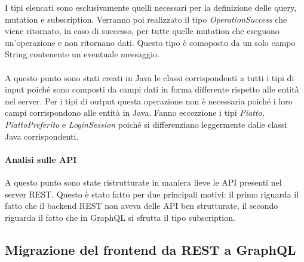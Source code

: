 I tipi elencati sono esclusivamente quelli necessari per la definizione delle query, mutation e subscription. Verranno poi realizzato il tipo \textit{OperationSuccess} che viene ritornato, in caso di successo, per tutte quelle mutation che eseguono un'operazione e non ritornano dati. Questo tipo è comoposto da un solo campo String contenente un eventuale messaggio.\\ \\
A questo punto sono stati creati in Java le classi corrispondenti a tutti i tipi di input poiché sono composti da campi dati in forma differente rispetto alle entità nel server. Per i tipi di output questa operazione non è necessaria poiché i loro campi corrispondono alle entità in Java. Fanno eccezzione i tipi \textit{Piatto}, \textit{PiattoPreferito} e \textit{LoginSession} poiché si differenziano leggermente dalle classi Java corrispondenti.
\paragraph{Analisi sulle API}
A questo punto sono state ristrutturate in maniera lieve le API presenti nel server REST. Questo è stato fatto per due principali motivi: il primo riguarda il fatto che il backend REST non aveva delle API ben strutturate, il secondo riguarda il fatto che in GraphQL si sfrutta il tipo subscription.




\subsection{Migrazione del frontend da REST a GraphQL}




